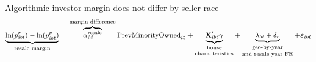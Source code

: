 \documentclass[aspectratio=169,t,11pt,table]{beamer}
\begin{document}
\begin{frame}{Algorithmic investor margin does not differ by seller race}{}\label{ai_margin}
    \centering
\vspace{-13mm}
\begin{align*}
\small
    \underbrace{\ln(p^r_{ibt}) - \ln(p^p_{ibt})}_{\text{resale margin}} = \overbrace{\alpha^{\text{resale}}_M}^{\text{\shortstack{margin difference}}}\text{PrevMinorityOwned}_{it}  + \underbrace{\mathbf{X}_{ibt}'\boldsymbol{\gamma}}_{\text{\shortstack{house \\ characteristics}}} + \underbrace{\lambda_{bt} + \delta_r}_{\text{\shortstack{geo-by-year \\ and resale year FE}}} + \varepsilon_{ibt}
\end{align*}
\begin{table}[htbp]
\centering
\scalebox{.65}{\makebox[\linewidth]{}}
\end{table}
\vspace{1mm}
\end{frame} 
\end{document}
